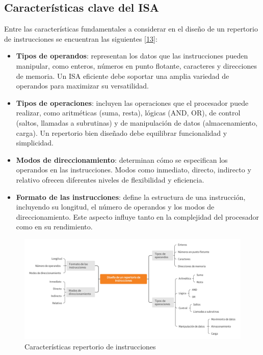 \documentclass[12pt,oneside]{templates/unerthesis}
\providecommand{\tightlist}{%
  \setlength{\itemsep}{0pt}\setlength{\parskip}{0pt}}
\begin{document}
\hypertarget{caracteruxedsticas-clave-del-isa}{%
\subsection{Características clave del ISA}\label{caracteruxedsticas-clave-del-isa}}

Entre las características fundamentales a considerar en el diseño de un repertorio de instrucciones se encuentran las siguientes \protect\hyperlink{ref-hennessy_computer_2012}{{[}13{]}}:

\begin{itemize}
\tightlist
\item
  \textbf{Tipos de operandos}: representan los datos que las instrucciones pueden manipular, como enteros, números en punto flotante, caracteres y direcciones de memoria. Un ISA eficiente debe soportar una amplia variedad de operandos para maximizar su versatilidad.
\item
  \textbf{Tipos de operaciones}: incluyen las operaciones que el procesador puede realizar, como aritméticas (suma, resta), lógicas (AND, OR), de control (saltos, llamadas a subrutinas) y de manipulación de datos (almacenamiento, carga). Un repertorio bien diseñado debe equilibrar funcionalidad y simplicidad.
\item
  \textbf{Modos de direccionamiento}: determinan cómo se especifican los operandos en las instrucciones. Modos como inmediato, directo, indirecto y relativo ofrecen diferentes niveles de flexibilidad y eficiencia.
\item
  \textbf{Formato de las instrucciones}: define la estructura de una instrucción, incluyendo su longitud, el número de operandos y los modos de direccionamiento. Este aspecto influye tanto en la complejidad del procesador como en su rendimiento.
\end{itemize}

\begin{figure}

{\centering \includegraphics[width=1\linewidth]{images/repInstCaracteristicas} 

}

\caption{Características repertorio de instrucciones}\label{fig:repInstCaracteristicas}
\end{figure}
\end{document}
